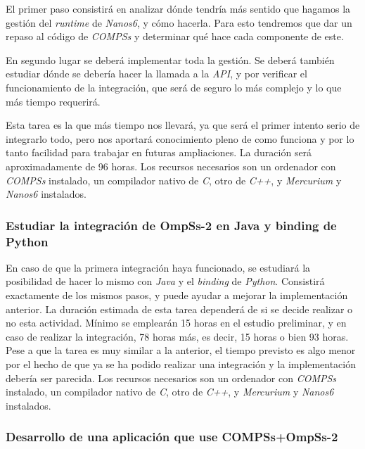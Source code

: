 El primer paso consistirá en analizar dónde tendría más sentido que hagamos la gestión del \textit{runtime} de \textit{Nanos6}, y cómo hacerla. Para esto tendremos que dar un repaso al código de \textit{COMPSs} y determinar qué hace cada componente de este. 

En segundo lugar se deberá implementar toda la gestión. Se deberá también estudiar dónde se debería hacer la llamada a la \textit{API}, y por verificar el funcionamiento de la integración, que será de seguro lo más complejo y lo que más tiempo requerirá.

Esta tarea es la que más tiempo nos llevará, ya que será el primer intento serio de integrarlo todo, pero nos aportará conocimiento pleno de como funciona y por lo tanto facilidad para trabajar en futuras ampliaciones. La duración será aproximadamente de 96 horas. Los recursos necesarios son un ordenador con \textit{COMPSs} instalado, un compilador nativo de \textit{C}, otro de \textit{C++}, y \textit{Mercurium} y \textit{Nanos6} instalados.

\subsubsection{Estudiar la integración de OmpSs-2 en Java y binding de Python}

En caso de que la primera integración haya funcionado, se estudiará la posibilidad de hacer lo mismo con \textit{Java} y el \textit{binding} de \textit{Python}. Consistirá exactamente de los mismos pasos, y puede ayudar a mejorar la implementación anterior. La duración estimada de esta tarea dependerá de si se decide realizar o no esta actividad. Mínimo se emplearán 15 horas en el estudio preliminar, y en caso de realizar la integración, 78 horas más, es decir, 15 horas o bien 93 horas. Pese a que la tarea es muy similar a la anterior, el tiempo previsto es algo menor por el hecho de que ya se ha podido realizar una integración y la implementación debería ser parecida. Los recursos necesarios son un ordenador con \textit{COMPSs} instalado, un compilador nativo de \textit{C}, otro de \textit{C++}, y \textit{Mercurium} y \textit{Nanos6} instalados.

\subsubsection{Desarrollo de una aplicación que use COMPSs+OmpSs-2}

